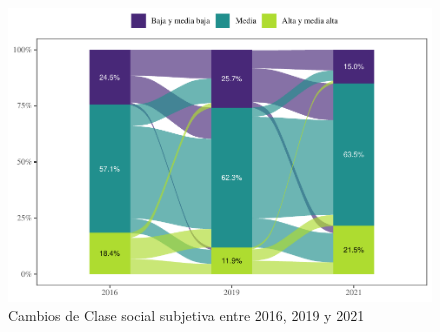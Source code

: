 \documentclass[
  12pt,
]{book}
\begin{document}
\begin{figure}

{\centering \includegraphics{reporte-elsoc_files/figure-latex/ess-cambio-1} 

}

\caption{Cambios de Clase social subjetiva entre 2016, 2019 y 2021}\label{fig:ess-cambio}
\end{figure}
\end{document}
